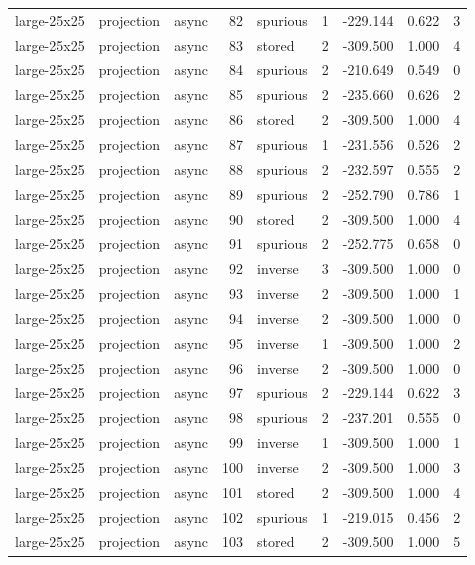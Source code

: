 \begin{tabular}{lllrlrrrr}
large-25x25 & projection & async & 82 & spurious & 1 & -229.144 & 0.622 & 3 \\
large-25x25 & projection & async & 83 & stored & 2 & -309.500 & 1.000 & 4 \\
large-25x25 & projection & async & 84 & spurious & 2 & -210.649 & 0.549 & 0 \\
large-25x25 & projection & async & 85 & spurious & 2 & -235.660 & 0.626 & 2 \\
large-25x25 & projection & async & 86 & stored & 2 & -309.500 & 1.000 & 4 \\
large-25x25 & projection & async & 87 & spurious & 1 & -231.556 & 0.526 & 2 \\
large-25x25 & projection & async & 88 & spurious & 2 & -232.597 & 0.555 & 2 \\
large-25x25 & projection & async & 89 & spurious & 2 & -252.790 & 0.786 & 1 \\
large-25x25 & projection & async & 90 & stored & 2 & -309.500 & 1.000 & 4 \\
large-25x25 & projection & async & 91 & spurious & 2 & -252.775 & 0.658 & 0 \\
large-25x25 & projection & async & 92 & inverse & 3 & -309.500 & 1.000 & 0 \\
large-25x25 & projection & async & 93 & inverse & 2 & -309.500 & 1.000 & 1 \\
large-25x25 & projection & async & 94 & inverse & 2 & -309.500 & 1.000 & 0 \\
large-25x25 & projection & async & 95 & inverse & 1 & -309.500 & 1.000 & 2 \\
large-25x25 & projection & async & 96 & inverse & 2 & -309.500 & 1.000 & 0 \\
large-25x25 & projection & async & 97 & spurious & 2 & -229.144 & 0.622 & 3 \\
large-25x25 & projection & async & 98 & spurious & 2 & -237.201 & 0.555 & 0 \\
large-25x25 & projection & async & 99 & inverse & 1 & -309.500 & 1.000 & 1 \\
large-25x25 & projection & async & 100 & inverse & 2 & -309.500 & 1.000 & 3 \\
large-25x25 & projection & async & 101 & stored & 2 & -309.500 & 1.000 & 4 \\
large-25x25 & projection & async & 102 & spurious & 1 & -219.015 & 0.456 & 2 \\
large-25x25 & projection & async & 103 & stored & 2 & -309.500 & 1.000 & 5 \\

\end{tabular}
